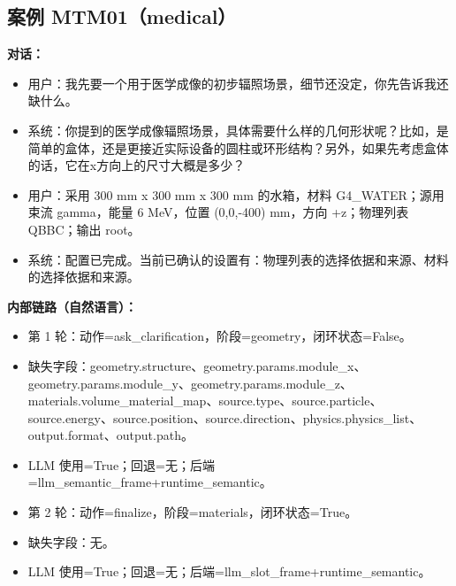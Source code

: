 \documentclass[11pt]{ctexart}
\begin{document}
\subsection{案例 MTM01（medical）}
\textbf{对话：}
\begin{itemize}
\item 用户：我先要一个用于医学成像的初步辐照场景，细节还没定，你先告诉我还缺什么。
\item 系统：你提到的医学成像辐照场景，具体需要什么样的几何形状呢？比如，是简单的盒体，还是更接近实际设备的圆柱或环形结构？另外，如果先考虑盒体的话，它在x方向上的尺寸大概是多少？
\item 用户：采用 300 mm x 300 mm x 300 mm 的水箱，材料 G4\_WATER；源用束流 gamma，能量 6 MeV，位置 (0,0,-400) mm，方向 +z；物理列表 QBBC；输出 root。
\item 系统：配置已完成。当前已确认的设置有：物理列表的选择依据和来源、材料的选择依据和来源。
\end{itemize}
\textbf{内部链路（自然语言）：}
\begin{itemize}
\item 第 1 轮：动作=ask\_clarification，阶段=geometry，闭环状态=False。
\item 缺失字段：geometry.structure、geometry.params.module\_x、geometry.params.module\_y、geometry.params.module\_z、materials.volume\_material\_map、source.type、source.particle、source.energy、source.position、source.direction、physics.physics\_list、output.format、output.path。
\item LLM 使用=True；回退=无；后端=llm\_semantic\_frame+runtime\_semantic。
\item 第 2 轮：动作=finalize，阶段=materials，闭环状态=True。
\item 缺失字段：无。
\item LLM 使用=True；回退=无；后端=llm\_slot\_frame+runtime\_semantic。
\end{itemize}
\end{document}
